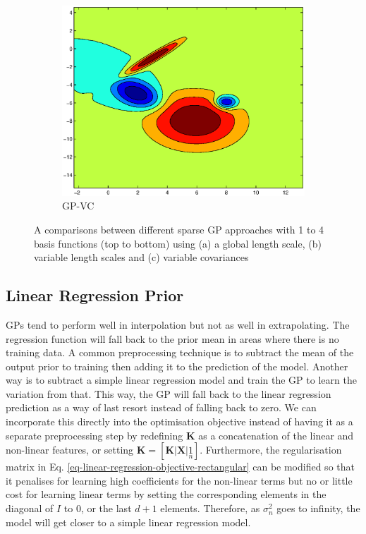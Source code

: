 \documentclass[useAMS,usenatbib,fleqn]{mn2e}
\newcommand{\bm}[1]{\mathbf{#1} }
\begin{document}
\begin{figure}
\begin{subfigure}[b]{0.3\columnwidth}
                \includegraphics[width=\textwidth]{figures/VC4.eps}
                \caption{GP-VC}
        \end{subfigure}
               
        \caption{A comparisons between different sparse GP approaches with 1 to 4 basis functions (top to bottom) using (a) a global length scale, (b) variable length scales and (c) variable covariances }
        \label{fig-toy-comparison}
\end{figure}

\subsection{Linear Regression Prior}

GPs tend to perform well in interpolation but not as well in extrapolating. The regression function will fall back to the prior mean in areas where there is no training data. A common preprocessing technique is to subtract the mean of the output prior to training then adding it to the prediction of the model. Another way is to subtract a simple linear regression model and train the GP to learn the variation from that. This way, the GP will fall back to the linear regression prediction as a way of last resort instead of falling back to zero. We can incorporate this directly into the optimisation objective instead of having it as a separate preprocessing step by redefining $\bm{K}$ as a concatenation of the linear and non-linear features, or setting $\bm{K}=[\bm{K}|\bm{X}|\underset{n}{1}]$. Furthermore, the regularisation matrix in Eq. \eqref{eq-linear-regression-objective-rectangular} can be modified so that it penalises for learning high coefficients for the non-linear terms but no or little cost for learning linear terms by setting the corresponding elements in the diagonal of $I$ to 0, or the last $d+1$ elements. Therefore, as $\sigma_{n}^{2}$ goes to infinity, the model will get closer to a simple linear regression model.
\end{document}
